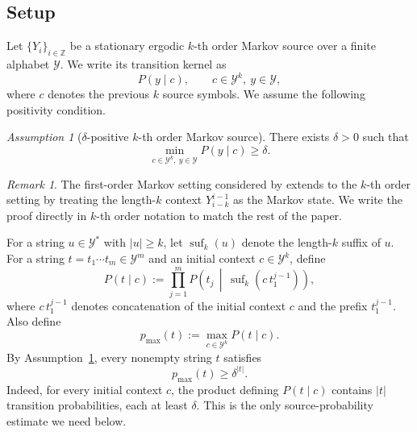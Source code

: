 \documentclass{article}
\theoremstyle{plain}
\theoremstyle{definition}
\theoremstyle{remark}
\newtheorem{remark}{Remark}[section]
\newtheorem{assumption}{Assumption}
\begin{document}
    \subsection{Setup}
    
    Let $\{Y_i\}_{i\in\mathbb Z}$ be a stationary ergodic $k$-th order Markov source
    over a finite alphabet $\mathcal Y$. We write its transition kernel as
    \[
        P(y\mid c),
        \qquad
        c\in\mathcal Y^k,\ y\in\mathcal Y,
    \]
    where $c$ denotes the previous $k$ source symbols. We assume the following
    positivity condition.
    
    \begin{assumption}[$\delta$-positive $k$-th order Markov source]
    \label{assump:hh-delta-positive}
    There exists $\delta>0$ such that
    \[
        \min_{c\in\mathcal Y^k,\ y\in\mathcal Y}P(y\mid c)\ge \delta .
    \]
    \end{assumption}
    
    \begin{remark}
    The first-order Markov setting considered by
    \citet{rajaramanAnalysisTokenizationTransformers2024} extends to the
    $k$-th order setting by treating the length-$k$ context $Y_{i-k}^{i-1}$ as the
    Markov state. We write the proof directly in $k$-th order notation to match the
    rest of the paper.
    \end{remark}
    
    For a string $u\in\mathcal Y^*$ with $|u|\ge k$, let
    $\operatorname{suf}_k(u)$ denote the length-$k$ suffix of $u$. For a string
    $t=t_1\cdots t_m\in\mathcal Y^m$ and an initial context
    $c\in\mathcal Y^k$, define
    \[
        P(t\mid c)
        :=
        \prod_{j=1}^{m}
        P\!\left(
            t_j
            \,\middle|\,
            \operatorname{suf}_k(c\,t_1^{j-1})
        \right),
    \]
    where $c\,t_1^{j-1}$ denotes concatenation of the initial context $c$ and the
    prefix $t_1^{j-1}$. Also define
    \[
        p_{\max}(t)
        :=
        \max_{c\in\mathcal Y^k}P(t\mid c).
    \]
    By Assumption~\ref{assump:hh-delta-positive}, every nonempty string $t$
    satisfies
    \begin{equation}
        p_{\max}(t)\ge \delta^{|t|}.
        \label{eq:pmax-lower-delta}
    \end{equation}
    Indeed, for every initial context $c$, the product defining $P(t\mid c)$
    contains $|t|$ transition probabilities, each at least $\delta$. This is the
    only source-probability estimate we need below.
    
\end{document}
